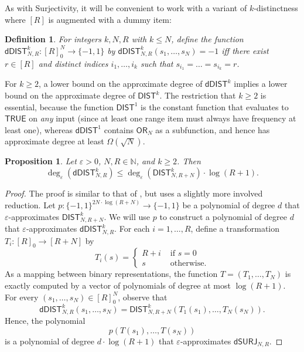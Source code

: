 \documentclass[11pt, letterpaper, fleqn]{article}
\newtheorem{definition}[theorem]{Definition}
\newtheorem{proposition}[theorem]{Proposition}
\theoremstyle{plain}
\newcommand{\DIST}{\mathsf{DIST}}
\newcommand{\dumSURJ}{\mathsf{dSURJ}}
\newcommand{\dumDIST}{\mathsf{dDIST}}
\newcommand{\OR}{\mathsf{ OR}}
\newcommand{\bits}{\{-1,1\}}
\newcommand{\N}{\mathbb{N}}
\newcommand{\eps}{\varepsilon}
\begin{document}
As with Surjectivity, it will be convenient to work with a variant of $k$-distinctness where $[R]$ is augmented with a dummy item:

\begin{definition}
For integers $k, N, R$ with $k \le N$, define the function $\dumDIST^k_{N, R} : [R]_0^N \to \bits$ by $\dumDIST^k_{N, R}(s_1, \dots, s_N) = -1$ iff there exist $r \in [R]$ and distinct indices $i_1, \dots, i_k$ such that $s_{i_1} = \dots = s_{i_k} = r$.
\end{definition}

For $k \ge 2$, a lower bound on the approximate degree of $\dumDIST^k$ implies a lower bound on the approximate degree of $\DIST^k$. The restriction that $k \ge 2$ is essential, because the function $\DIST^1$ is the constant function that evaluates to $\mathsf{TRUE}$ on \emph{any} input (since at least one range item must always have frequency at least one), whereas $\dumDIST^1$ contains $\OR_N$ as a subfunction, and hence has approximate degree at least $\Omega(\sqrt{N})$.

\begin{proposition} \label{prop:dumdist-reduction}
Let $\eps > 0$, $N, R \in \N$, and $k \ge 2$. Then
\[ \deg_\eps(\dumDIST^k_{N, R}) \le \deg_\eps(\DIST^k_{N, R+N}) \cdot \log(R+1).\]
\end{proposition}

\begin{proof}
The proof is similar to that of , but uses a slightly more involved reduction. Let $p : \bits^{2N\cdot \log(R+N)} \to \bits$ be a polynomial of degree $d$ that $\eps$-approximates $\DIST^k_{N, R+N}$. We will use $p$ to construct a polynomial of degree $d$ that $\eps$-approximates $\dumDIST^k_{N, R}$. For each $i = 1, \dots, R$, define a transformation $T_i : [R]_0 \to [R+N]$ by
\[T_i(s) = \begin{cases}
R + i & \text{ if } s = 0 \\
s & \text{ otherwise}.
\end{cases}\]
As a mapping between binary representations, the function $T=(T_1, \dots, T_N)$ is exactly computed by a vector of polynomials of degree at most $\log(R+1)$. For every $(s_1, \dots, s_N) \in [R]_0^N$, observe that
\[\dumDIST^k_{N, R}(s_1, \dots, s_N) = \DIST^k_{N, R+N}(T_1(s_1), \dots, T_N(s_N)).\]
Hence, the polynomial
\[p(T(s_1), \dots, T(s_N))\]
is a polynomial of degree $d \cdot \log(R+1)$ that $\eps$-approximates $\dumSURJ_{N, R}$.
\end{proof}
\end{document}
